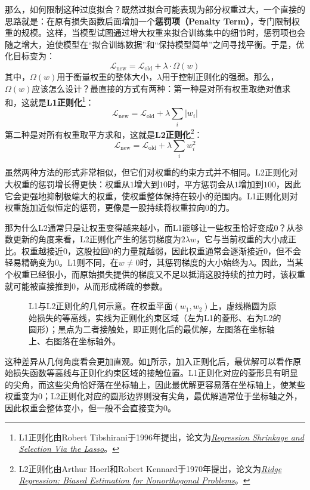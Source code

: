 那么，如何限制这种过度拟合？既然过拟合可能表现为部分权重过大，一个直接的思路就是：在原有损失函数后面增加一个\textbf{惩罚项（Penalty Term）}，专门限制权重的规模。这样，当模型试图通过增大权重来拟合训练集中的细节时，惩罚项也会随之增大，迫使模型在“拟合训练数据”和“保持模型简单”之间寻找平衡。于是，优化目标变为：
$$
\mathcal{L}_{\text{new}}=\mathcal{L}_{\text{old}}+\lambda\cdot\Omega(w)
$$
其中，$\Omega(w)$用于衡量权重的整体大小，$\lambda$用于控制正则化的强弱。那么，$\Omega(w)$应该怎么设计？最直接的方式有两种：第一种是对所有权重取绝对值求和，这就是\textbf{L1正则化}\footnote{L1正则化由Robert Tibshirani于1996年提出，论文为\href{https://doi.org/10.1111/j.2517-6161.1996.tb02080.x}{\textit{Regression Shrinkage and Selection Via the Lasso}}。}：
$$
\mathcal{L}_{\text{new}}=\mathcal{L}_{\text{old}}+\lambda\sum_i|w_i|
$$
第二种是对所有权重取平方求和，这就是\textbf{L2正则化}\footnote{L2正则化由Arthur Hoerl和Robert Kennard于1970年提出，论文为\href{https://doi.org/10.1080/00401706.1970.10488635}{\textit{Ridge Regression: Biased Estimation for Nonorthogonal Problems}}。}：
$$
\mathcal{L}_{\text{new}}=\mathcal{L}_{\text{old}}+\lambda\sum_iw_i^2
$$

虽然两种方法的形式非常相似，但它们对权重的约束方式并不相同。L2正则化对大权重的惩罚增长得更快：权重从$1$增大到$10$时，平方惩罚会从$1$增加到$100$，因此它会更强地抑制极端大的权重，使权重整体保持在较小的范围内。L1正则化则对权重施加近似恒定的惩罚，更像是一股持续将权重拉向$0$的力。

那为什么L2通常只是让权重变得越来越小，而L1能够让一些权重恰好变成$0$？从参数更新的角度来看，L2正则化产生的惩罚梯度为$2\lambda w$，它与当前权重的大小成正比。权重越接近$0$，这股拉回$0$的力量就越弱，因此权重通常会逐渐接近$0$，但不会轻易精确变为$0$。L1则不同，在$w\neq0$时，其惩罚梯度的大小始终为$\lambda$。因此，当某个权重已经很小，而原始损失提供的梯度又不足以抵消这股持续的拉力时，该权重就可能被直接推到$0$，从而形成稀疏的参数。

\begin{figure}[H]
    \caption{L1与L2正则化的几何示意。在权重平面$(w_1, w_2)$上，虚线椭圆为原始损失的等高线，实线为正则化约束区域（左为L1的菱形、右为L2的圆形）；黑点为二者接触处，即正则化后的最优解，左图落在坐标轴上、右图落在坐标轴外。}
    \label{fig:l1_l2}
\end{figure}

这种差异从几何角度看会更加直观。如\cref{fig:l1_l2}所示，加入正则化后，最优解可以看作原始损失函数等高线与正则化约束区域的接触位置。L1正则化对应的菱形具有明显的尖角，而这些尖角恰好落在坐标轴上，因此最优解更容易落在坐标轴上，使某些权重变为$0$；L2正则化对应的圆形边界则没有尖角，最优解通常位于坐标轴之外，因此权重会整体变小，但一般不会直接变为$0$。

